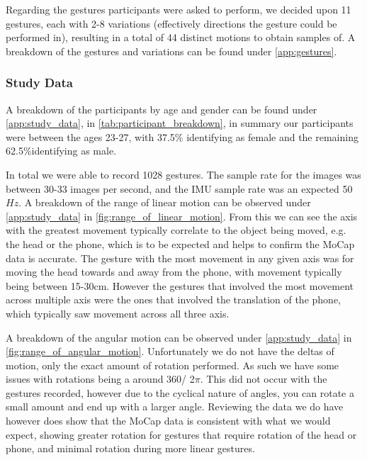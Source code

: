 Regarding the gestures participants were asked to perform, we decided upon 11 gestures, each with 2-8 variations (effectively directions the gesture could be performed in), resulting in a total of 44 distinct motions to obtain samples of. A breakdown of the gestures and variations can be found under \autoref{app:gestures}.

\subsubsection{Study Data}\nl
A breakdown of the participants by age and gender can be found under \autoref{app:study_data}, in \autoref{tab:participant_breakdown}, in summary our participants were between the ages 23-27, with 37.5\% identifying as female and the remaining 62.5\%identifying as male.

In total we were able to record 1028 gestures. The sample rate for the images was between 30-33 images per second, and the IMU sample rate was an expected 50$Hz$.
A breakdown of the range of linear motion can be observed under \autoref{app:study_data} in \autoref{fig:range_of_linear_motion}.
From this we can see the axis with the greatest movement typically correlate to the object being moved, e.g. the head or the phone, which is to be expected and helps to confirm the MoCap data is accurate.
The gesture with the most movement in any given axis was for moving the head towards and away from the phone, with movement typically being between 15-30cm. However the gestures that involved the most movement across multiple axis were the ones that involved the translation of the phone, which typically saw movement across all three axis.

A breakdown of the angular motion can be observed under \autoref{app:study_data} in \autoref{fig:range_of_angular_motion}.
Unfortunately we do not have the deltas of motion, only the exact amount of rotation performed. As such we have some issues with rotations being a around 360\textdegree / 2$\pi$. This did not occur with the gestures recorded, however due to the cyclical nature of angles, you can rotate a small amount and end up with a larger angle. 
Reviewing the data we do have however does show that the MoCap data is consistent with what we would expect, showing greater rotation for gestures that require rotation of the head or phone, and minimal rotation during more linear gestures.

